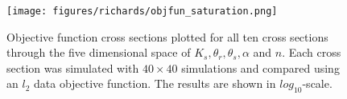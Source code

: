 \begin{figure}[!htbp]
\begin{center}
\texttt{[image: figures/richards/objfun\_saturation.png]}
\end{center}
\caption{
    Objective function cross sections plotted for all ten cross sections through the five dimensional space of
    $K_s, \theta_r, \theta_s, \alpha$ and $n$. Each cross section was simulated with $40 \times 40$ simulations
    and compared using an $l_2$ data objective function. The results are shown in $log_{10}$-scale.
}
\label{fig:richards-objfun-sat}
\end{figure}
